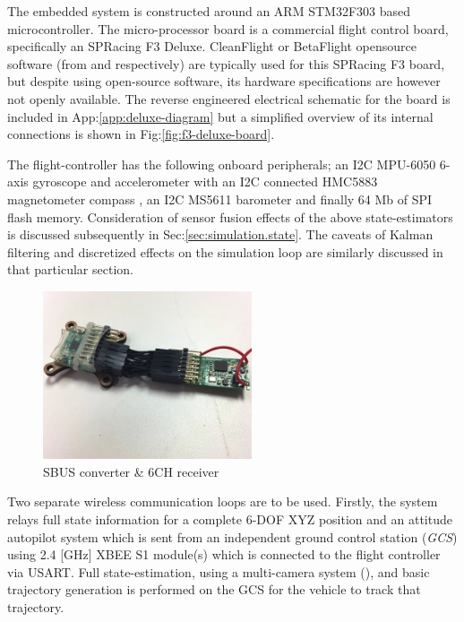 The embedded system is constructed around an ARM STM32F303\cite{stm32f303} based microcontroller. The micro-processor board is a commercial flight control board, specifically an SPRacing F3 Deluxe\cite{spracing}. CleanFlight or BetaFlight opensource software (from \cite{cleanflight} and \cite{betaflight} respectively) are typically used for this SPRacing F3 board, but despite using open-source software, its hardware specifications are  however not openly available. The reverse engineered electrical schematic for the board is included in App:\ref{app:deluxe-diagram} but a simplified overview of its internal connections is shown in Fig:\ref{fig:f3-deluxe-board}.
\par
The flight-controller has the following onboard peripherals; an I2C MPU-6050 6-axis gyroscope and accelerometer \cite{mpu6050} with an I2C connected HMC5883 magnetometer compass \cite{hmc5883}, an I2C MS5611 barometer \cite{ms5611} and finally 64 Mb of SPI flash memory. Consideration of sensor fusion effects of the above state-estimators is discussed subsequently in Sec:\ref{sec:simulation.state}. The caveats of Kalman filtering and discretized effects on the simulation loop are similarly discussed in that particular section.
\begin{figure}[hbtp]
\centering
\includegraphics[width=0.55\textwidth]{figs/ppm-sbus}
\caption{SBUS converter \& 6CH receiver}
\label{fig:ppm-sbus}
\vspace{-20pt}
\end{figure}
\par
Two separate wireless communication loops are to be used. Firstly, the system relays full state information for a complete 6-DOF XYZ position and an attitude autopilot system which is sent from an independent ground control station (\emph{GCS}) using 2.4 [GHz] XBEE S1 module(s)\cite{xbees1} which is connected to the flight controller via USART. Full state-estimation, using a multi-camera system (\hspace{-3pt}\cite{arnold}), and basic trajectory generation is performed on the GCS for the vehicle to track that trajectory. 
